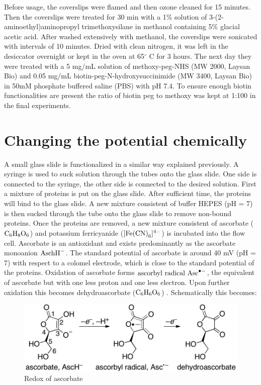\documentclass[twoside,single]{lion-msc}
\begin{document}
Before usage, the coverslips were flamed and then ozone cleaned for 15 minutes. Then the coverslips were treated for 30 min with a 1\% solution of 3-(2-aminoethyl)aminopropyl trimethoxysilane in methanol containing 5\% glacial acetic acid. After washed extensively with methanol, the coverslips were sonicated with intervals of 10 minutes. Dried with clean nitrogen, it was left in the desiccator overnight or kept in the oven at 65$^{\circ}$ C for 3 hours. The next day they were treated with a 5 mg/mL solution of methoxy-peg-NHS (MW 2000, Laysan Bio) and 0.05 mg/mL biotin-peg-N-hydroxysuccinimide (MW 3400, Laysan Bio) in 50mM phosphate buffered saline (PBS)  with pH 7.4. To ensure enough biotin functionalities are present the ratio of biotin peg to methoxy was kept at 1:100 in the final experiments.  






\section{Changing the potential chemically}\label{pot_chem}

A small glass slide is functionalized in a similar way explained previously. A syringe is used to suck solution through the tubes onto the glass slide. One side is connected to the syringe, the other side is connected to the desired solution. First a mixture of proteins is put on the glass slide. After sufficient time, the proteins will bind to the glass slide. A new mixture consistent of buffer HEPES (pH = 7) is then sucked through the tube onto the glass slide to remove non-bound proteins. Once the proteins are removed, a new mixture consistent of ascorbate ($\textup{C}_{6}\textup{H}_{8}\textup{O}_{6}$) and potassium ferricyanide ($[\textup{Fe(CN)}_{6}]^{4-}$) is incubated into the flow cell. Ascorbate is an antioxidant and exists predominantly as the ascorbate monoanion  $\textup{AschH}^{-}$. The standard potential of ascorbate is around 40 mV (pH = 7) with respect to a colomel electrode, which is close to the standard potential of the proteins. Oxidation of ascorbate forms $\textup{ascorbyl radical Asc}^{\bullet  -}$, the equivalent of ascorbate but with one less proton and one less electron. Upon further oxidation this becomes dehydroascorbate ($\textup{C}_{6}\textup{H}_{6}\textup{O}_{6}$) \cite{Warren2010}. Schematically this becomes:

\begin{figure}[ht!]
\centering
\includegraphics[width=\textwidth]{redox_asc}
\caption{Redox of ascorbate}
\label{redox_asc}
\end{figure}
\end{document}

